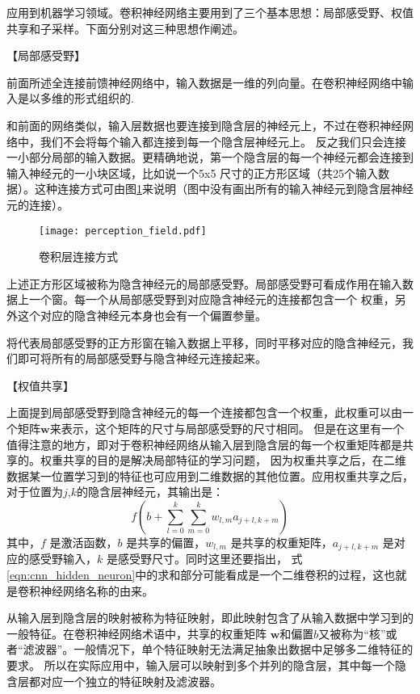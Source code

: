 应用到机器学习领域。卷积神经网络主要用到了三个基本思想：局部感受野、权值共享和子采样。下面分别对这三种思想作阐述。

【局部感受野】

前面所述全连接前馈神经网络中，输入数据是一维的列向量。在卷积神经网络中输入是以多维的形式组织的.

和前面的网络类似，输入层数据也要连接到隐含层的神经元上，不过在卷积神经网络中，我们不会将每个输入都连接到每一个隐含层神经元上。
反之我们只会连接一小部分局部的输入数据。更精确地说，第一个隐含层的每一个神经元都会连接到输入神经元的一小块区域，比如说一个5x5
尺寸的正方形区域（共25个输入数据）。这种连接方式可由图\ref{perception_filed}来说明（图中没有画出所有的输入神经元到隐含层神经元的连接）。

\begin{figure}[htbp]
	\texttt{[image: perception\_field.pdf]}
	\caption{卷积层连接方式}
	\label{perception_filed}
\end{figure}

上述正方形区域被称为隐含神经元的局部感受野。局部感受野可看成作用在输入数据上一个窗。每一个从局部感受野到对应隐含神经元的连接都包含一个
权重，另外这个对应的隐含神经元本身也会有一个偏置参量。

将代表局部感受野的正方形窗在输入数据上平移，同时平移对应的隐含神经元，我们即可将所有的局部感受野与隐含神经元连接起来。

【权值共享】

上面提到局部感受野到隐含神经元的每一个连接都包含一个权重，此权重可以由一个矩阵$\mathbf{w}$来表示，这个矩阵的尺寸与局部感受野的尺寸相同。
但是在这里有一个值得注意的地方，即对于卷积神经网络从输入层到隐含层的每一个权重矩阵都是共享的。权重共享的目的是解决局部特征的学习问题，
因为权重共享之后，在二维数据某一位置学习到的特征也可应用到二维数据的其他位置。应用权重共享之后，对于位置为$j$,$k$的隐含层神经元，其输出是：
\begin{equation} 
\label{eqn:cnn_hidden_neuron}
f\left(b+\sum_{l=0}^{k} \sum_{m=0}^{k} w_{l, m} a_{j+l, k+m}\right)
\end{equation}
其中，$f$ 是激活函数，$b$ 是共享的偏置，$w_{l,m}$ 是共享的权重矩阵，$a_{j+l,k+m}$ 是对应的感受野输入，$k$ 是感受野尺寸。同时这里还要指出，
式\ref{eqn:cnn_hidden_neuron}中的求和部分可能看成是一个二维卷积的过程，这也就是卷积神经网络名称的由来。

从输入层到隐含层的映射被称为特征映射，即此映射包含了从输入数据中学习到的一般特征。在卷积神经网络术语中，共享的权重矩阵
$\mathbf{w}$和偏置$b$又被称为“核”或者“滤波器”。一般情况下，单个特征映射无法满足抽象出数据中足够多二维特征的要求。
所以在实际应用中，输入层可以映射到多个并列的隐含层，其中每一个隐含层都对应一个独立的特征映射及滤波器。

